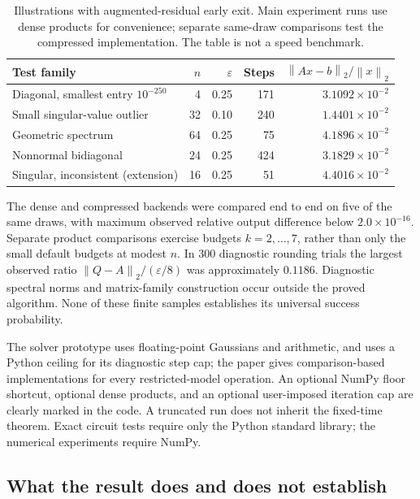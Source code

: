 \documentclass[11pt,a4paper]{article}
\theoremstyle{remark}
\newcommand{\eps}{\varepsilon}
\newcommand{\norm}[1]{\left\|#1\right\|_2}
\begin{document}
\begin{table}[ht]
\centering
\small
\begin{tabular}{@{}lrrrr@{}}
\toprule
Test family & $n$ & $\eps$ & Steps & $\norm{Ax-b}/\norm{x}$\\
\midrule
Diagonal, smallest entry $10^{-250}$ & 4 & 0.25 & 171 & $3.1092\!\times\!10^{-2}$\\
Small singular-value outlier & 32 & 0.10 & 240 & $1.4401\!\times\!10^{-2}$\\
Geometric spectrum & 64 & 0.25 & 75 & $4.1896\!\times\!10^{-2}$\\
Nonnormal bidiagonal & 24 & 0.25 & 424 & $3.1829\!\times\!10^{-2}$\\
Singular, inconsistent (extension) & 16 & 0.25 & 51 & $4.4016\!\times\!10^{-2}$\\
\bottomrule
\end{tabular}
\caption{Illustrations with augmented-residual early exit. Main experiment
runs use dense products for convenience; separate same-draw comparisons test
the compressed implementation. The table is not a speed benchmark.}
\label{tab:tests}
\end{table}

The dense and compressed backends were compared end to end on five of the
same draws, with maximum observed relative output difference below
$2.0\times10^{-16}$. Separate product comparisons exercise budgets
$k=2,\ldots,7$, rather than only the small default budgets at modest $n$.
In $300$ diagnostic rounding trials the largest observed ratio
$\norm{Q-A}/(\eps/8)$ was approximately $0.1186$. Diagnostic spectral norms
and matrix-family construction occur outside the proved algorithm.
None of these finite samples establishes its universal success probability.

The solver prototype uses floating-point Gaussians and arithmetic, and uses a
Python ceiling for its diagnostic step cap; the paper gives comparison-based
implementations for every restricted-model operation. An optional NumPy floor
shortcut, optional dense products, and an optional user-imposed iteration cap
are clearly marked in the code. A truncated run does not inherit the
fixed-time theorem. Exact circuit tests require only the Python standard
library; the numerical experiments require NumPy.

\subsection{What the result does and does not establish}
\end{document}
